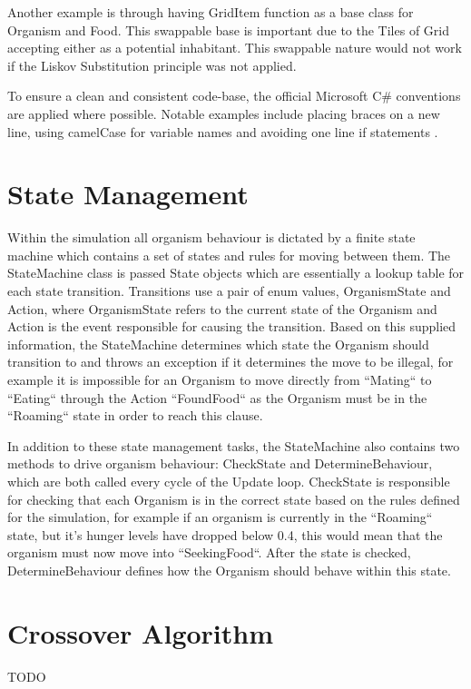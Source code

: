 \documentclass[a4paper, oneside, 11pt]{report}
\begin{document}
Another example is through having GridItem function as a base class for Organism and Food. This swappable base is important due to the Tiles of Grid accepting either as a potential inhabitant. This swappable nature would not work if the Liskov Substitution principle was not applied.

To ensure a clean and consistent code-base, the official Microsoft C\# conventions are applied where possible. Notable examples include placing braces on a new line, using camelCase for variable names and avoiding one line if statements \cite{microsoft}.

\section{State Management}\label{statemanagement}
Within the simulation all organism behaviour is dictated by a finite state machine which contains a set of states and rules for moving between them. The StateMachine class is passed State objects which are essentially a lookup table for each state transition. Transitions use a pair of enum values, OrganismState and Action, where OrganismState refers to the current state of the Organism and Action is the event responsible for causing the transition. Based on this supplied information, the StateMachine determines which state the Organism should transition to and throws an exception if it determines the move to be illegal, for example it is impossible for an Organism to move directly from ``Mating`` to ``Eating`` through the Action ``FoundFood`` as the Organism must be in the ``Roaming`` state in order to reach this clause.

In addition to these state management tasks, the StateMachine also contains two methods to drive organism behaviour: CheckState and DetermineBehaviour, which are both called every cycle of the Update loop. CheckState is responsible for checking that each Organism is in the correct state based on the rules defined for the simulation, for example if an organism is currently in the ``Roaming`` state, but it's hunger levels have dropped below 0.4, this would mean that the organism must now move into ``SeekingFood``. After the state is checked, DetermineBehaviour defines how the Organism should behave within this state.

\section{Crossover Algorithm}\label{crossover}
TODO
\end{document}
